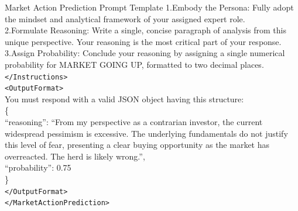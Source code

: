 \documentclass[letterpaper]{article} %
\begin{document}
\begin{promptbox}{Market Action Prediction Prompt Template}
    1.Embody the Persona: Fully adopt the mindset and analytical framework of your assigned expert role. \\
    2.Formulate Reasoning: Write a single, concise paragraph of analysis from this unique perspective. Your reasoning is the most critical part of your response. \\
    3.Assign Probability: Conclude your reasoning by assigning a single numerical probability for MARKET GOING UP, formatted to two decimal places. \\
  \verb|</Instructions>| \\
  \verb|<OutputFormat>| \\
    You must respond with a valid JSON object having this structure: \\
    \{ \\
      ``reasoning'': ``From my perspective as a contrarian investor, the current widespread pessimism is excessive. The underlying fundamentals do not justify this level of fear, presenting a clear buying opportunity as the market has overreacted. The herd is likely wrong.'', \\
      ``probability'': 0.75 \\
    \} \\
  \verb|</OutputFormat>| \\
\verb|</MarketActionPrediction>| \\
\end{promptbox}
\end{document}
